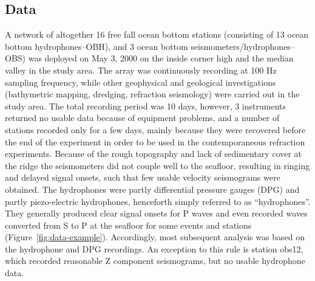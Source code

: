 \documentclass[jgr]{agu2001}
\newlength{\tw}
\begin{document}
\begin{article}
\subsection{Data}

A network of altogether 16 free fall ocean bottom stations (consisting
of 13 ocean bottom hydro\-phones--OBH), and 3 ocean bottom seismometers/hydro\-phones--OBS) was deployed
on May 3, 2000 on the inside corner high and the median valley in the
study area.  The array was continuously recording at 100 Hz sampling frequency, while other
geophysical and geological investigations (bathymetric mapping,
dredging, refraction seismology) were carried out in the study area.
The total recording period was 10 days, however, 3 instruments
returned no usable data because of equipment problems, and a number of
stations recorded only for a few days, mainly because they were
recovered before the end of the experiment in order to be used in the
contemporaneous refraction experiments.  Because of the rough
topography and lack of sedimentary cover at the ridge the seismometers
did not couple well to the seafloor, resulting in ringing and delayed
signal onsets, such that few usable velocity seismograms were
obtained.  The hydrophones were partly differential pressure gauges
(DPG) and partly piezo-electric hydrophones, henceforth simply
referred to as ``hydrophones''.  They generally produced clear signal onsets for
P waves and even recorded waves converted from S to P at the seafloor
for some events and stations
(Figure~\ref{fig:data-example}). Accordingly, most subsequent analysis
was based on the hydrophone and DPG recordings.  An
exception to this rule is station obs12, which recorded reasonable Z
component seismograms, but no usable hydrophone data.  


\end{article}
\end{document}
